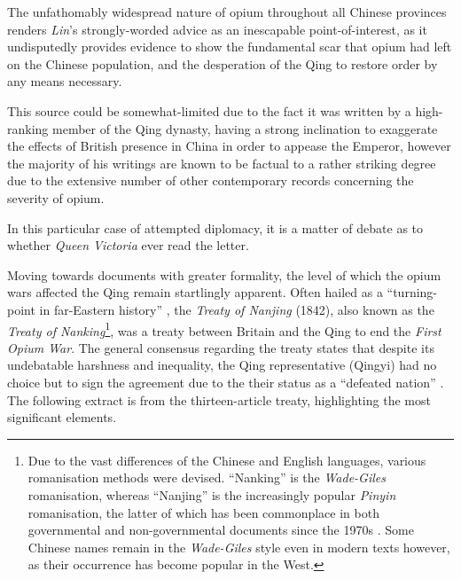\documentclass[a4paper,oneside]{article}
\begin{document}
The unfathomably widespread nature of opium throughout all Chinese provinces
renders \textit{Lin}'s strongly-worded advice as an inescapable
point-of-interest, as it undisputedly provides evidence to show the fundamental
scar that opium had left on the Chinese population, and the desperation of the
Qing to restore order by any means necessary.

This source could be somewhat-limited due to the fact it was written by a
high-ranking member of the Qing dynasty, having a strong inclination to
exaggerate the effects of British presence in China in order to appease the
Emperor, however the majority of his writings are known to be factual to a
rather striking degree due to the extensive number of other contemporary records
concerning the severity of opium.

In this particular case of attempted diplomacy, it is a matter of debate as to
whether \textit{Queen Victoria} ever read the letter.

Moving towards documents with greater formality, the level of which the opium
wars affected the Qing remain startlingly apparent. Often hailed as a
``turning-point in far-Eastern history'' \autocite{Fairbank:1940}, the
\textit{Treaty of Nanjing} (1842), also known as the \textit{Treaty of
Nanking}\footnote{Due to the vast differences of the Chinese and English
languages, various romanisation methods were devised.  ``Nanking'' is the
\textit{Wade-Giles} romanisation, whereas ``Nanjing'' is the increasingly
popular \textit{Pinyin} romanisation, the latter of which has been commonplace
in both governmental and non-governmental documents since the 1970s
\autocite{Tao:1991}. Some Chinese names remain in the \textit{Wade-Giles} style
even in modern texts however, as their occurrence has become popular in the
West.}, was a treaty between Britain and the Qing to end the \textit{First Opium
War}. The general consensus regarding the treaty states that despite its
undebatable harshness and inequality, the Qing representative (Qingyi) had no
choice but to sign the agreement due to the their status as a ``defeated
nation'' \autocite{Mao:2018}. The following extract is from the thirteen-article
treaty, highlighting the most significant elements.

\end{document}
